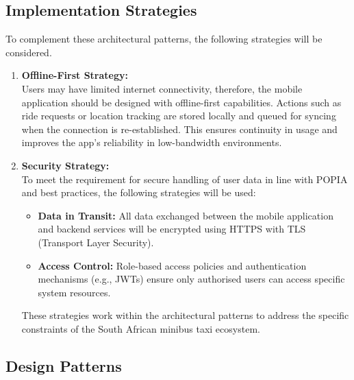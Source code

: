 \documentclass[a4paper,12pt]{article}
\begin{document}
\subsection{Implementation Strategies}
To complement these architectural patterns, the following strategies will be considered.

\begin{enumerate}
    \item \textbf{Offline-First Strategy:}\\
    Users may have limited internet connectivity, therefore, the mobile application should be designed with offline-first capabilities. Actions such as ride requests or location tracking are stored locally and queued for syncing when the connection is re-established. This ensures continuity in usage and improves the app’s reliability in low-bandwidth environments.

    \item \textbf{Security Strategy:}\\
    To meet the requirement for secure handling of user data in line with POPIA and best practices, the following strategies will be used:
    \begin{itemize}
        \item \textbf{Data in Transit:} All data exchanged between the mobile application and backend services will be encrypted using HTTPS with TLS (Transport Layer Security).
        \item \textbf{Access Control:} Role-based access policies and authentication mechanisms (e.g., JWTs) ensure only authorised users can access specific system resources.
    \end{itemize}
    These strategies work within the architectural patterns to address the specific constraints of the South African minibus taxi ecosystem.
\end{enumerate}

\subsection{Design Patterns}
\end{document}
